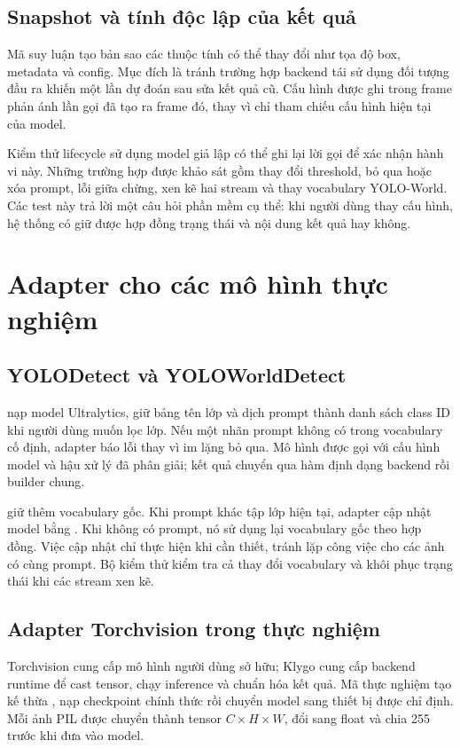\subsection{Snapshot và tính độc lập của kết quả}
Mã suy luận tạo bản sao các thuộc tính có thể thay đổi như tọa độ box, metadata và config. Mục đích là tránh trường hợp backend tái sử dụng đối tượng đầu ra khiến một lần dự đoán sau sửa kết quả cũ. Cấu hình được ghi trong frame phản ánh lần gọi đã tạo ra frame đó, thay vì chỉ tham chiếu cấu hình hiện tại của model.

Kiểm thử lifecycle sử dụng model giả lập có thể ghi lại lời gọi để xác nhận hành vi này. Những trường hợp được khảo sát gồm thay đổi threshold, bỏ qua hoặc xóa prompt, lỗi giữa chừng, xen kẽ hai stream và thay vocabulary YOLO-World. Các test này trả lời một câu hỏi phần mềm cụ thể: khi người dùng thay cấu hình, hệ thống có giữ được hợp đồng trạng thái và nội dung kết quả hay không.

\section{Adapter cho các mô hình thực nghiệm}
\subsection{YOLODetect và YOLOWorldDetect}
 nạp model Ultralytics, giữ bảng tên lớp và dịch prompt thành danh sách class ID khi người dùng muốn lọc lớp. Nếu một nhãn prompt không có trong vocabulary cố định, adapter báo lỗi thay vì im lặng bỏ qua. Mô hình được gọi với cấu hình model và hậu xử lý đã phân giải; kết quả chuyển qua hàm định dạng backend rồi builder chung.

 giữ thêm vocabulary gốc. Khi prompt khác tập lớp hiện tại, adapter cập nhật model bằng . Khi không có prompt, nó sử dụng lại vocabulary gốc theo hợp đồng. Việc cập nhật chỉ thực hiện khi cần thiết, tránh lặp công việc cho các ảnh có cùng prompt. Bộ kiểm thử kiểm tra cả thay đổi vocabulary và khôi phục trạng thái khi các stream xen kẽ.

\subsection{Adapter Torchvision trong thực nghiệm}
Torchvision cung cấp mô hình người dùng sở hữu; Klygo cung cấp backend runtime để cast tensor, chạy inference và chuẩn hóa kết quả. Mã thực nghiệm tạo  kế thừa , nạp checkpoint chính thức rồi chuyển model sang thiết bị được chỉ định. Mỗi ảnh PIL được chuyển thành tensor $C\times H\times W$, đổi sang float và chia 255 trước khi đưa vào model.

